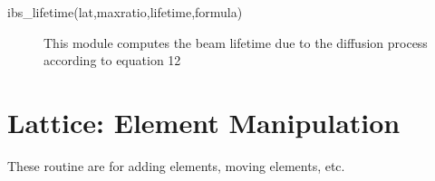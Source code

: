 \begin{description}

\label{r:ibs.lifetime}
\item[ibs_lifetime(lat,maxratio,lifetime,formula)] \Newline 
 This module computes the beam lifetime due to
 the diffusion process according to equation 12

\end{description}

\section{Lattice: Element Manipulation}
\label{r:elem}     

These routine are for adding elements, moving elements, etc.

